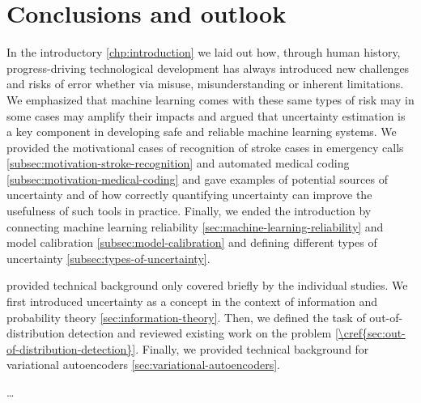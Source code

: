 
\chapter[conclusions and outlook]{Conclusions and outlook}\label{chp:conclusion}

In the introductory \cref{chp:introduction} we laid out how, through human history, progress-driving technological development has always introduced new challenges and risks of error whether via misuse, misunderstanding or inherent limitations. We emphasized that machine learning comes with these same types of risk may in some cases may amplify their impacts and argued that uncertainty estimation is a key component in developing safe and reliable machine learning systems. We provided the motivational cases of recognition of stroke cases in emergency calls \cref{subsec:motivation-stroke-recognition} and automated medical coding \cref{subsec:motivation-medical-coding} and gave examples of potential sources of uncertainty and of how correctly quantifying uncertainty can improve the usefulness of such tools in practice. Finally, we ended the introduction by connecting machine learning reliability \cref{sec:machine-learning-reliability} and model calibration \cref{subsec:model-calibration} and defining different types of uncertainty \cref{subsec:types-of-uncertainty}.

 provided technical background only covered briefly by the individual studies. We first introduced uncertainty as a concept in the context of information and probability theory \cref{sec:information-theory}. Then, we defined the task of out-of-distribution detection and reviewed existing work on the problem \cref{\cref{sec:out-of-distribution-detection}}. Finally, we provided technical background for variational autoencoders \cref{sec:variational-autoencoders}.

\dots
